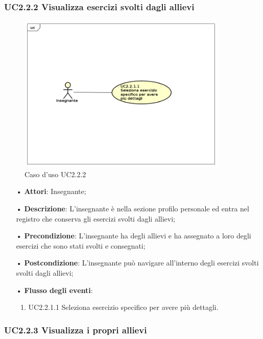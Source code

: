 \subsubsection{UC2.2.2  Visualizza esercizi svolti dagli allievi}
\begin{figure}[H]
\centering
\includegraphics[width=10cm]{img/UC222.png} 
\caption{Caso d'uso UC2.2.2}
\end{figure}
\begin{itemize}
	\item[•] \textbf{Attori}:  Insegnante;
	\item[•] \textbf{Descrizione}:  L’insegnante è nella sezione profilo personale ed entra
		nel registro che conserva gli esercizi svolti dagli allievi;
	\item[•] \textbf{Precondizione}:  L’insegnante ha degli allievi e ha assegnato a loro degli esercizi che sono stati svolti e consegnati;

	\item[•] \textbf{Postcondizione}: L’insegnante può navigare all’interno degli esercizi svolti 
                       svolti dagli allievi; 

	\item[•] \textbf{Flusso degli eventi}:
		\begin{enumerate}
			\item UC2.2.1.1  Seleziona esercizio specifico per avere più dettagli.	
		\end{enumerate}
\end{itemize}

\subsubsection{UC2.2.3 Visualizza i propri allievi}

